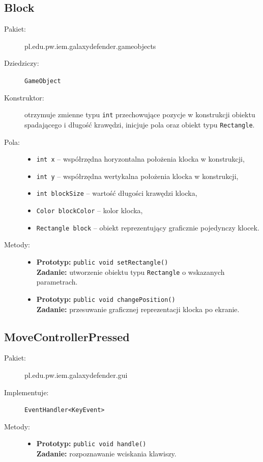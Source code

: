 \documentclass[a4paper]{article}
\newcommand{\prog}{\texttt}
\begin{document}
\subsection{Block}
\begin{description}
    \item[Pakiet:] pl.edu.pw.iem.galaxydefender.gameobjects
    \item[Dziedziczy:] \prog{GameObject}
    \item[Konstruktor:] otrzymuje zmienne typu \prog{int} przechowujące pozycje w konstrukcji obiektu spadającego i długość krawędzi, inicjuje pola oraz obiekt typu \prog{Rectangle}.
    \item[Pola:] \hfill
    \begin{itemize}
        \item \prog{int x} -- współrzędna horyzontalna położenia klocka w konstrukcji,
        \item \prog{int y} -- współrzędna wertykalna położenia klocka w konstrukcji,
        \item \prog{int blockSize} -- wartość długości krawędzi klocka,
        \item \prog{Color blockColor} -- kolor klocka,
        \item \prog{Rectangle block} -- obiekt reprezentujący graficznie pojedynczy klocek.
    \end{itemize}
    \item[Metody:] \hfill
    \begin{itemize}
        \item \textbf{Prototyp:} \prog{public void setRectangle()}\\\textbf{Zadanie:} utworzenie obiektu typu \prog{Rectangle} o wskazanych parametrach.
        \item \textbf{Prototyp:} \prog{public void changePosition()}\\\textbf{Zadanie:} przesuwanie graficznej reprezentacji klocka po ekranie.
    \end{itemize}
\end{description}

\subsection{MoveControllerPressed}
\begin{description}
    \item[Pakiet:] pl.edu.pw.iem.galaxydefender.gui
    \item[Implementuje:] \prog{EventHandler<KeyEvent>}
    \item[Metody:] \hfill
    \begin{itemize}
        \item \textbf{Prototyp:} \prog{public void handle()}\\\textbf{Zadanie:} rozpoznawanie wciskania klawiszy.
    \end{itemize}
\end{description}
\end{document}
